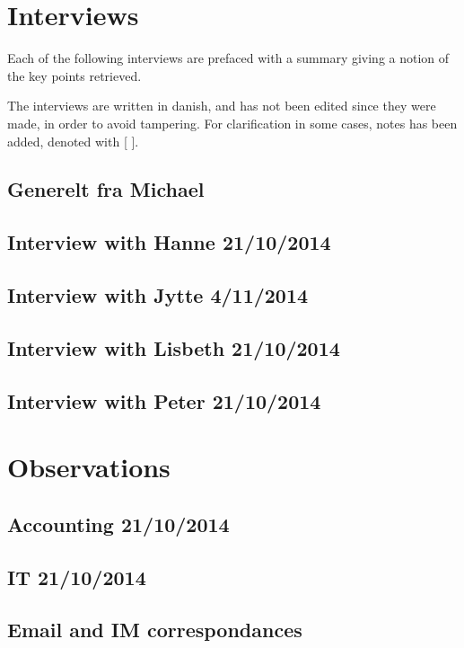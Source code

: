 \chapter{Interviews}
\label{app:interviews}
Each of the following interviews are prefaced with a summary giving a notion of the key points retrieved.

The interviews are written in danish, and has not been edited since they were made, in order to avoid tampering.
For clarification in some cases, notes has been added, denoted with [ ].

\section{Generelt fra Michael}

\section{Interview with Hanne 21/10/2014}

\section{Interview with Jytte 4/11/2014}

\section{Interview with Lisbeth 21/10/2014}

\section{Interview with Peter 21/10/2014}

\chapter{Observations}
\section{Accounting 21/10/2014}

\section{IT 21/10/2014}

\section{Email and IM correspondances}

